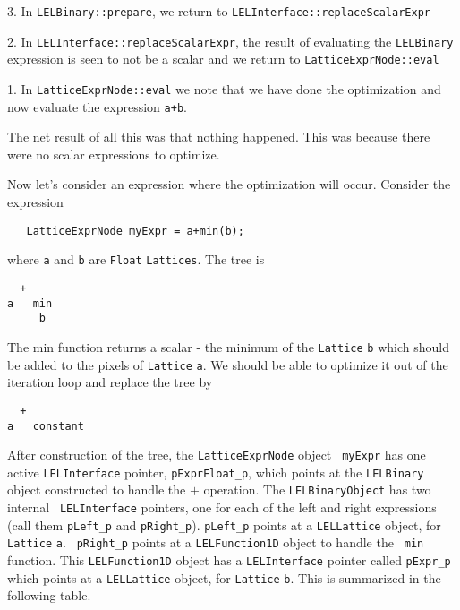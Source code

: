3. In {\tt LELBinary::prepare}, we return to {\tt LELInterface::replaceScalarExpr} 

2. In {\tt LELInterface::replaceScalarExpr}, the result of evaluating the {\tt LELBinary} expression 
is seen to not be a scalar and we return to {\tt LatticeExprNode::eval} 

1.  In {\tt LatticeExprNode::eval} we note that we have done the optimization 
and now evaluate the expression {\tt a+b}.


The net result of all this was that nothing happened.  This was because
there were no scalar expressions to optimize.  


Now let's consider an expression where the optimization will occur. 
Consider the expression 

\begin{verbatim}
   LatticeExprNode myExpr = a+min(b);
\end{verbatim}

where {\tt a} and {\tt b} are {\tt Float} {\tt Lattices}.  The tree is 

\begin{verbatim}
  +
a   min
     b
\end{verbatim}

The min function returns a scalar - the minimum of the {\tt Lattice} {\tt b}
which should be added to the pixels of {\tt Lattice} {\tt a}.  We should be able
to optimize it out of the iteration loop and replace the tree by

\begin{verbatim}
  +
a   constant
\end{verbatim}


After construction of the tree, the {\tt LatticeExprNode} object {\tt
myExpr} has one active {\tt LELInterface} pointer, {\tt pExprFloat\_p},
which points at the {\tt LELBinary} object constructed to handle the $+$
operation.  The {\tt LELBinaryObject} has two internal {\tt
LELInterface} pointers, one for each of the left and right expressions
(call them {\tt pLeft\_p} and {\tt pRight\_p}).  {\tt pLeft\_p}
points at a {\tt LELLattice} object, for {\tt Lattice} {\tt a}.  {\tt
pRight\_p} points at a {\tt LELFunction1D} object to handle the {\tt
min} function.  This {\tt LELFunction1D} object has a {\tt LELInterface}
pointer called {\tt pExpr\_p} which points at a {\tt LELLattice} object, for
{\tt Lattice} {\tt b}.  This is summarized in the following table. 


